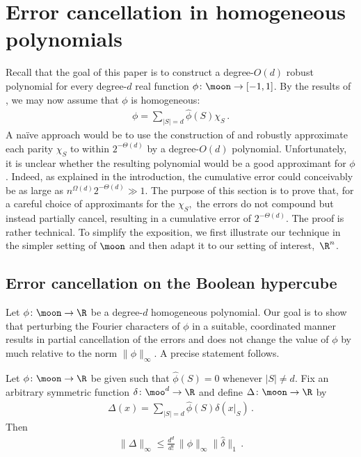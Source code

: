 \section{Error cancellation in homogeneous polynomials}

Recall that
the goal of this paper is to construct a degree-$O(d)$ robust
polynomial for every degree-$d$ real function
$\phi\colon\moon\to[-1,1]$. By
the results of , we may
now assume that $\phi$ is homogeneous:
\begin{align*}
\phi = \sum_{|S|=d} \hat\phi(S)\chi_S\,.
\end{align*}
A na\"ive approach would be to use the construction of
 and robustly
approximate each parity $\chi_S$ to within
$2^{-\Theta(d)}$ by a degree-$O(d)$ polynomial.
Unfortunately, it is unclear whether the resulting
polynomial would be a good approximant for $\phi$.
Indeed, as explained in the introduction,
the cumulative error 
could conceivably be as large as $n^{\Omega(d)} 
2^{-\Theta(d)}\gg1$.
The purpose of this section is to prove that, for a
careful choice of approximants for the $\chi_S,$ the
errors do not compound but instead partially cancel,
resulting in a cumulative error of
$2^{-\Theta(d)}$. The proof is rather technical.
To simplify the exposition, we first illustrate our
technique in the simpler setting of $\moon$ and
then adapt it to our setting of interest,~$\R^n$. 

\subsection*{Error cancellation on the Boolean hypercube}
Let $\phi\colon\moon\to\R$ be a degree-$d$ homogeneous
polynomial. Our
goal is to show that perturbing the Fourier characters of
$\phi$ in a suitable, coordinated manner results in
partial cancellation of the errors and does not change 
the value of $\phi$ by much
relative to the norm $\|\phi\|_\infty$.  A precise
statement follows.

\begin{theorem}
\label{thm:error-compounding-multilinear}
Let $\phi\colon\moon\to\R$ be given such that
$\hat\phi(S)=0$ whenever $|S|\ne d$.
Fix an arbitrary symmetric function
$\delta\colon\moo^d\to\R$ and define
$\Delta\colon\moon\to\R$ by
\begin{align*}
\Delta(x) = \sum_{|S|=d}\hat\phi(S) \delta(x|_S)\,.
\end{align*}
Then
\begin{align*}
\|\Delta\|_\infty \leq 
\frac{d^d}{d!}\, \|\phi\|_\infty \|\hat \delta\|_1\,.
\end{align*}
\end{theorem}


